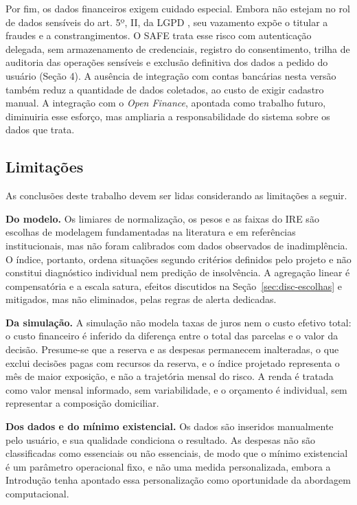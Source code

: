 \documentclass[portuguese]{sbc2025}%
\begin{document}
Por fim, os dados financeiros exigem cuidado especial. Embora não estejam no rol de dados sensíveis do art. 5º, II, da LGPD \citep{lgpd}, seu vazamento expõe o titular a fraudes e a constrangimentos. O SAFE trata esse risco com autenticação delegada, sem armazenamento de credenciais, registro do consentimento, trilha de auditoria das operações sensíveis e exclusão definitiva dos dados a pedido do usuário (Seção 4). A ausência de integração com contas bancárias nesta versão também reduz a quantidade de dados coletados, ao custo de exigir cadastro manual. A integração com o \textit{Open Finance}, apontada como trabalho futuro, diminuiria esse esforço, mas ampliaria a responsabilidade do sistema sobre os dados que trata.

\subsection{Limitações}
\label{sec:limitacoes}

As conclusões deste trabalho devem ser lidas considerando as limitações a seguir.

\textbf{Do modelo.} Os limiares de normalização, os pesos e as faixas do IRE são escolhas de modelagem fundamentadas na literatura e em referências institucionais, mas não foram calibrados com dados observados de inadimplência. O índice, portanto, ordena situações segundo critérios definidos pelo projeto e não constitui diagnóstico individual nem predição de insolvência. A agregação linear é compensatória e a escala satura, efeitos discutidos na Seção~\ref{sec:disc-escolhas} e mitigados, mas não eliminados, pelas regras de alerta dedicadas.

\textbf{Da simulação.} A simulação não modela taxas de juros nem o custo efetivo total: o custo financeiro é inferido da diferença entre o total das parcelas e o valor da decisão. Presume-se que a reserva e as despesas permanecem inalteradas, o que exclui decisões pagas com recursos da reserva, e o índice projetado representa o mês de maior exposição, e não a trajetória mensal do risco. A renda é tratada como valor mensal informado, sem variabilidade, e o orçamento é individual, sem representar a composição domiciliar.

\textbf{Dos dados e do mínimo existencial.} Os dados são inseridos manualmente pelo usuário, e sua qualidade condiciona o resultado. As despesas não são classificadas como essenciais ou não essenciais, de modo que o mínimo existencial é um parâmetro operacional fixo, e não uma medida personalizada, embora a Introdução tenha apontado essa personalização como oportunidade da abordagem computacional.
\end{document}
